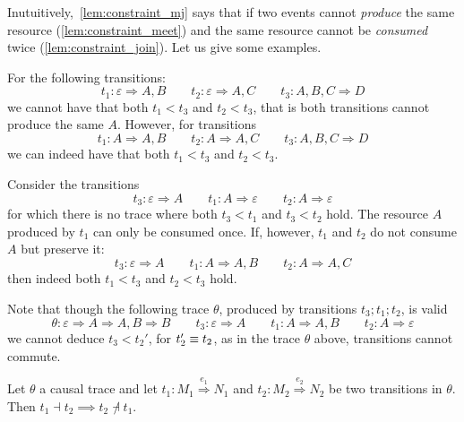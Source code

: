 Inutuitively,~\autoref{lem:constraint_mj} says that if two events cannot \emph{produce} the same resource (\autoref{lem:constraint_meet}) and the same resource cannot be \emph{consumed} twice (\autoref{lem:constraint_join}). Let us give some examples.
\begin{example}
  For the following transitions:
  \[
  t_1: \varepsilon \Rightarrow A,B \qquad t_2: \varepsilon \Rightarrow A,C \qquad t_3: A,B,C \Rightarrow D
  \]
  we cannot have that both $t_1<t_3$ and $t_2<t_3$, that is both transitions cannot produce the same $A$. However, for transitions
  \[
  t_1: A \Rightarrow A,B \qquad t_2: A \Rightarrow A,C \qquad t_3: A,B,C \Rightarrow D
  \]
  we can indeed have that both $t_1<t_3$ and $t_2<t_3$.
\end{example}
\begin{example}
  Consider the transitions
  \[
  t_3: \varepsilon \Rightarrow A\qquad t_1: A\Rightarrow \varepsilon \qquad t_2: A\Rightarrow \varepsilon
  \]
  for which there is no trace where both $t_3<t_1$ and $t_3<t_2$ hold. The resource $A$ produced by $t_1$ can only be consumed once.
  If, however, $t_1$ and $t_2$ do not consume $A$ but preserve it:
  \[
  t_3: \varepsilon \Rightarrow A\qquad t_1: A\Rightarrow A,B \qquad t_2: A\Rightarrow A,C
  \]
  then indeed both $t_1<t_3$ and $t_2<t_3$ hold.

  Note that though the following trace $\theta$, produced by transitions $t_3;t_1;t_2$, is valid
  \[
  \theta:\varepsilon \Rightarrow A \Rightarrow A, B\Rightarrow B\qquad t_3: \varepsilon \Rightarrow A\qquad t_1: A\Rightarrow A,B\qquad t_2: A\Rightarrow \varepsilon
  \]
  we cannot deduce $t_3<t_2'$, for $t_2'\equiv t_2$, as in the trace $\theta$ above, transitions cannot commute.
\end{example}

\begin{lemma}
  \label{lem:inhibiting_pair}
  Let $\theta$ a causal trace and let $t_1:M_1\overset{e_1}{\Rightarrow}N_1$ and $t_2:M_2\overset{e_2}{\Rightarrow}N_2$ be two transitions in $\theta$. Then $t_1\dashv t_2\implies t_2\not\dashv t_1$.
\end{lemma}



